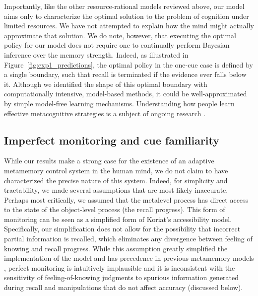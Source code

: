 Importantly, like the other resource-rational models reviewed above, our model aims only to characterize the optimal solution to the problem of cognition under limited resources. We have not attempted to explain how the mind might actually approximate that solution. We do note, however, that executing the optimal policy for our model does not require one to continually perform Bayesian inference over the memory strength. Indeed, as illustrated in Figure~\ref{fig:exp1_predictions}, the optimal policy in the one-cue case is defined by a single boundary, such that recall is terminated if the evidence ever falls below it. Although we identified the shape of this optimal boundary with computationally intensive, model-based methods, it could be well-approximated by simple model-free learning mechanisms. Understanding how people learn effective metacognitive strategies is a subject of ongoing research \citep{lieder2018rational,jain2019how,callaway2022leveraging,binz2022heuristics,he2022where}.

\subsection{Imperfect monitoring and cue familiarity}
While our results make a strong case for the existence of an adaptive metamemory control system in the human mind, we do not claim to have characterized the precise nature of this system. Indeed, for simplicity and tractability, we made several assumptions that are most likely inaccurate. 
Perhaps most critically, we assumed that the metalevel process has direct access to the state of the object-level process (the recall progress). This form of monitoring can be seen as a simplified form of Koriat's \citeyearpar{koriat1993how} accessibility model. Specifically, our simplification does not allow for the possibility that incorrect partial information is recalled, which eliminates any divergence between feeling of knowing and recall progress. While this assumption greatly simplified the implementation of the model and has precedence in previous metamemory models \citep{suchow2016deciding,hu2019role}, perfect monitoring is intuitively implausible and it is inconsistent with the sensitivity of feeling-of-knowing judgments to spurious information generated during recall \citep{koriat1993how} and manipulations that do not affect accuracy (discussed below).

